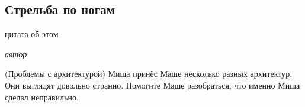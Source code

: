 \subsection*{Стрельба по ногам}

\epigraph{цитата об этом}{\textit{автор}}


\begin{problem}{(Проблемы с архитектурой)}
Миша принёс Маше несколько разных архитектур. Они выглядят довольно странно. Помогите Маше разобраться, что именно Миша сделал неправильно. 








\end{problem}

